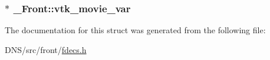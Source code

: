 \subsubsection[{\texorpdfstring{vtk\+\_\+movie\+\_\+var}{vtk_movie_var}}]{$\ast$ \+\_\+\+Front\+::vtk\+\_\+movie\+\_\+var}\hypertarget{struct___front_acb042ccf7e393a9270b8a80449b75a3d}{}\label{struct___front_acb042ccf7e393a9270b8a80449b75a3d}


The documentation for this struct was generated from the following file\+:\begin{DoxyCompactItemize}
\item 
D\+N\+S/src/front/\hyperlink{fdecs_8h}{fdecs.\+h}\end{DoxyCompactItemize}
